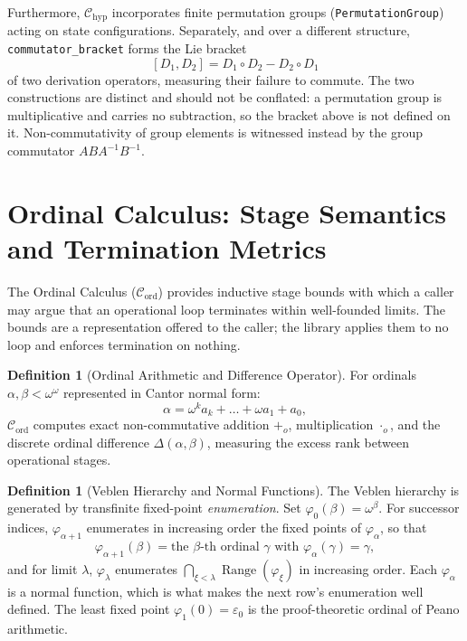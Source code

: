 \documentclass[11pt]{article}
\theoremstyle{definition}
\newtheorem{definition}[theorem]{Definition}
\begin{document}
Furthermore, $\mathcal{C}_{\mathrm{hyp}}$ incorporates finite permutation groups (\texttt{PermutationGroup}) acting on state configurations. Separately, and over a different structure, \texttt{commutator\_bracket} forms the Lie bracket
\[
[D_1, D_2] = D_1 \circ D_2 - D_2 \circ D_1
\]
of two derivation operators, measuring their failure to commute. The two constructions are distinct and should not be conflated: a permutation group is multiplicative and carries no subtraction, so the bracket above is not defined on it. Non-commutativity of group elements is witnessed instead by the group commutator $ABA^{-1}B^{-1}$.

\section{Ordinal Calculus: Stage Semantics and Termination Metrics}
The Ordinal Calculus ($\mathcal{C}_{\mathrm{ord}}$) provides inductive stage bounds with which a caller may argue that an operational loop terminates within well-founded limits. The bounds are a representation offered to the caller; the library applies them to no loop and enforces termination on nothing.

\begin{definition}[Ordinal Arithmetic and Difference Operator]
For ordinals $\alpha, \beta < \omega^\omega$ represented in Cantor normal form:
\[
\alpha = \omega^k a_k + \dots + \omega a_1 + a_0,
\]
$\mathcal{C}_{\mathrm{ord}}$ computes exact non-commutative addition $+_o$, multiplication $\cdot_o$, and the discrete ordinal difference $\Delta(\alpha, \beta)$, measuring the excess rank between operational stages.
\end{definition}

\begin{definition}[Veblen Hierarchy and Normal Functions]
The Veblen hierarchy is generated by transfinite fixed-point \emph{enumeration}. Set $\varphi_0(\beta) = \omega^\beta$. For successor indices, $\varphi_{\alpha+1}$ enumerates in increasing order the fixed points of $\varphi_\alpha$, so that
\[
\varphi_{\alpha+1}(\beta) = \text{the } \beta\text{-th ordinal } \gamma \text{ with } \varphi_\alpha(\gamma) = \gamma,
\]
and for limit $\lambda$, $\varphi_\lambda$ enumerates $\bigcap_{\xi < \lambda} \operatorname{Range}(\varphi_\xi)$ in increasing order. Each $\varphi_\alpha$ is a normal function, which is what makes the next row's enumeration well defined. The least fixed point $\varphi_1(0) = \varepsilon_0$ is the proof-theoretic ordinal of Peano arithmetic.
\end{definition}
\end{document}
